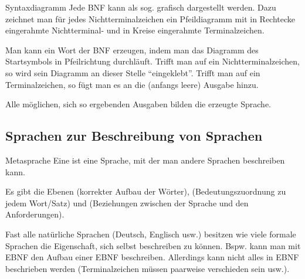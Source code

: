 \begin{Def}{Syntaxdiagramm}
    Jede BNF kann als sog.  grafisch dargestellt
    werden. Dazu zeichnet man für jedes Nichtterminalzeichen ein Pfeildiagramm
    mit in Rechtecke eingerahmte Nichtterminal- und in Kreise eingerahmte
    Terminalzeichen.

    Man kann ein Wort der BNF erzeugen, indem man das Diagramm des
    Startsymbols in Pfeilrichtung durchläuft. Trifft man auf ein
    Nichtterminalzeichen, so wird sein Diagramm an dieser Stelle
    "`eingeklebt"'. Trifft man auf ein Terminalzeichen, so fügt man es an die
    (anfangs leere) Ausgabe hinzu.

    Alle möglichen, sich so ergebenden Ausgaben bilden die erzeugte Sprache.
\end{Def}

\subsection{%
    Sprachen zur Beschreibung von Sprachen%
}

\begin{Def}{Metasprache}
    Eine  ist eine Sprache, mit der man andere Sprachen
    beschreiben kann.

    Es gibt die Ebenen  (korrekter Aufbau der Wörter),
     (Bedeutungszuordnung zu jedem Wort/Satz) und
     (Beziehungen zwischen der Sprache und den
    Anforderungen).

    Fast alle natürliche Sprachen (Deutsch, Englisch usw.) besitzen wie viele
    formale Sprachen die Eigenschaft, sich selbst beschreiben zu können.
    Bspw. kann man mit EBNF den Aufbau einer EBNF beschreiben.
    Allerdings kann nicht alles in EBNF beschrieben werden
    (Terminalzeichen müssen paarweise verschieden sein usw.).
\end{Def}

\pagebreak
